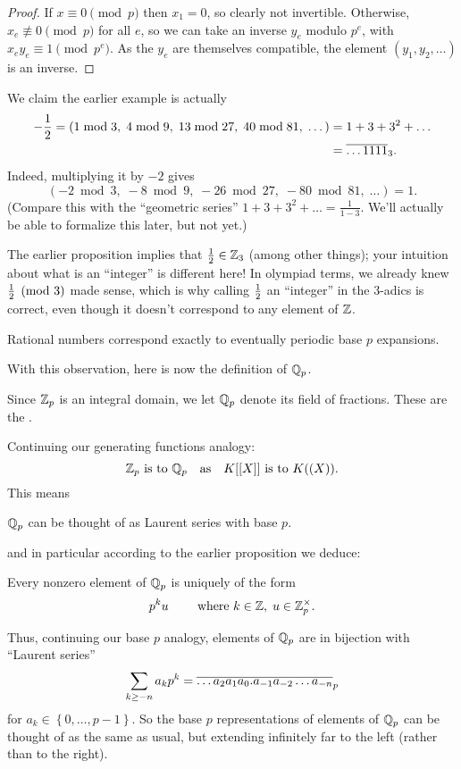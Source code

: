 \begin{proof}
	If $x \equiv 0 \pmod p$ then $x_1 = 0$,
	so clearly not invertible.
	Otherwise, $x_e \not\equiv 0 \pmod p$ for all $e$,
	so we can take an inverse $y_e$ modulo $p^e$,
	with $x_e y_e \equiv 1 \pmod{p^e}$.
	As the $y_e$ are themselves compatible,
	the element $(y_1, y_2, \dots)$ is an inverse.
\end{proof}
\begin{example}
	[We have $-\half = \ol{\dots1111}_3 \in \ZZ_3$]
	We claim the earlier example is actually
	\begin{align*}
	-\frac{1}{2} = \left( 1 \bmod 3, \; 4 \bmod 9, \;
	13 \bmod{27}, \; 40 \bmod{81}, \; \dots \right)
	&= 1 + 3 + 3^2 + \dots \\
	&= \overline{\dots1111}_3.
	\end{align*}
	Indeed, multiplying it by $-2$ gives
	\[ \left( -2 \bmod 3, \; -8 \bmod 9, \;
		-26 \bmod{27}, \; -80 \bmod{81}, \; \dots \right)
		= 1. \]
	(Compare this with the ``geometric series''
	$1 + 3 + 3^2 + \dots = \frac{1}{1-3}$.
	We'll actually be able to formalize this later, but not yet.)
\end{example}
\begin{remark}
	The earlier proposition implies that $\frac{1}{2} \in \mathbb Z_3$
	(among other things);
	your intuition about what is an ``integer'' is different here!
	In olympiad terms, we already knew $\frac{1}{2} \pmod 3$ made sense,
	which is why calling $\frac{1}{2}$ an ``integer''
	in the $3$-adics is correct,
	even though it doesn't correspond to any element of $\mathbb Z$.
\end{remark}
\begin{exercise}
	Rational numbers correspond exactly to
	eventually periodic base $p$ expansions.
\end{exercise}

With this observation, here is now the definition of $\QQ_p$.
\begin{definition}
	[Introducing $\QQ_p$]
	Since $\mathbb Z_p$ is an integral domain,
	we let $\QQ_p$ denote its field of fractions.
	These are the .
\end{definition}
Continuing our generating functions analogy:
\[ \mathbb Z_p \text{ is to } \mathbb Q_p
	\quad\text{as}\quad
	K[[X]] \text{ is to } K((X)). \]
This means
\begin{moral}
	$\QQ_p$ can be thought of as Laurent series with base $p$.
\end{moral}
and in particular according to the earlier proposition we deduce:
\begin{proposition}
	Every nonzero element of $\QQ_p$ is uniquely of the form
	\[ p^k u \qquad \text{ where } k \in \mathbb Z, \; u \in \mathbb Z_p^\times. \]
\end{proposition}
Thus, continuing our base $p$ analogy,
elements of $\QQ_p$ are in bijection with ``Laurent series''
\[ \sum_{k \ge -n} a_k p^k
	= \overline{\dots a_2 a_1 a_0 . a_{-1} a_{-2} \dots a_{-n}}_p \]
for $a_k \in \left\{ 0, \dots, p-1 \right\}$.
So the base $p$ representations of elements of $\QQ_p$
can be thought of as the same as usual,
but extending infinitely far to the left
(rather than to the right).

